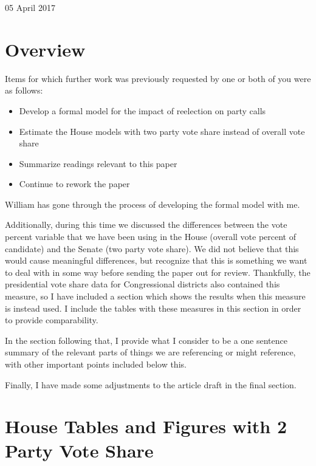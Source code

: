 \documentclass[12pt]{article}
\begin{document}
	
\begin{center}
	\Large 05 April 2017
\end{center}

\section{Overview}

Items for which further work was previously requested by one or both of you were as follows:
\begin{itemize}
	\item Develop a formal model for the impact of reelection on party calls
	
	\item Estimate the House models with two party vote share instead of overall vote share
	
	\item Summarize readings relevant to this paper
	
	\item Continue to rework the paper
\end{itemize}
William has gone through the process of developing the formal model with me. 

Additionally, during this time we discussed the differences between the vote percent variable that we have been using in the House (overall vote percent of candidate) and the Senate (two party vote share). We did not believe that this would cause meaningful differences, but recognize that this is something we want to deal with in some way before sending the paper out for review. Thankfully, the presidential vote share data for Congressional districts also contained this measure, so I have included a section which shows the results when this measure is instead used. I include the tables with these measures in this section in order to provide comparability.

In the section following that, I provide what I consider to be a one sentence summary of the relevant parts of things we are referencing or might reference, with other important points included below this.

Finally, I have made some adjustments to the article draft in the final section.



\section{House Tables and Figures with 2 Party Vote Share}
\end{document}
